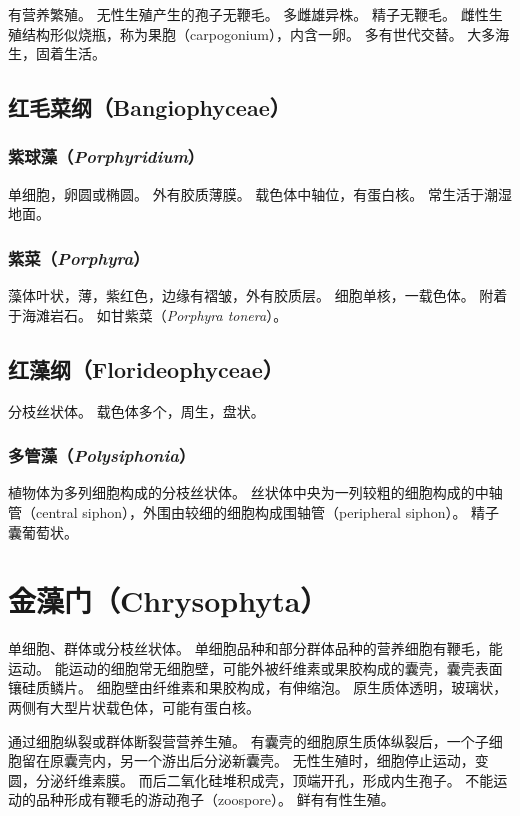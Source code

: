 \documentclass[11pt]{article}
\begin{document}
\par

有营养繁殖。
无性生殖产生的孢子无鞭毛。
多雌雄异株。
精子无鞭毛。
雌性生殖结构形似烧瓶，称为果胞（carpogonium），内含一卵。
多有世代交替。
大多海生，固着生活。

\subsection{红毛菜纲（Bangiophyceae）}
\subsubsection{紫球藻（\textit{Porphyridium}）}
单细胞，卵圆或椭圆。
外有胶质薄膜。
载色体中轴位，有蛋白核。
常生活于潮湿地面。

\subsubsection{紫菜（\textit{Porphyra}）}
藻体叶状，薄，紫红色，边缘有褶皱，外有胶质层。
细胞单核，一载色体。
附着于海滩岩石。
如甘紫菜（\textit{Porphyra tonera}）。

\subsection{红藻纲（Florideophyceae）}
分枝丝状体。
载色体多个，周生，盘状。

\subsubsection{多管藻（\textit{Polysiphonia}）}
植物体为多列细胞构成的分枝丝状体。
丝状体中央为一列较粗的细胞构成的中轴管（central siphon），外围由较细的细胞构成围轴管（peripheral siphon）。
精子囊葡萄状。

\section{金藻门（Chrysophyta）}
单细胞、群体或分枝丝状体。
单细胞品种和部分群体品种的营养细胞有鞭毛，能运动。
能运动的细胞常无细胞壁，可能外被纤维素或果胶构成的囊壳，囊壳表面镶硅质鳞片。
细胞壁由纤维素和果胶构成，有伸缩泡。
原生质体透明，玻璃状，两侧有大型片状载色体，可能有蛋白核。

\par

通过细胞纵裂或群体断裂营营养生殖。
有囊壳的细胞原生质体纵裂后，一个子细胞留在原囊壳内，另一个游出后分泌新囊壳。
无性生殖时，细胞停止运动，变圆，分泌纤维素膜。
而后二氧化硅堆积成壳，顶端开孔，形成内生孢子。
不能运动的品种形成有鞭毛的游动孢子（zoospore）。
鲜有有性生殖。
\end{document}
